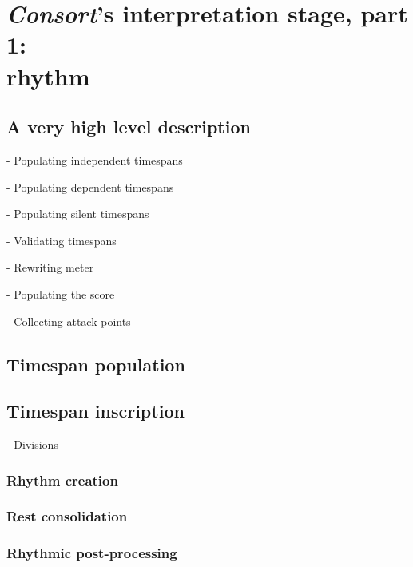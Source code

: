 \chapter[\emph{Consort}'s interpretation stage, part 1: rhythm]{
    \emph{Consort}'s interpretation stage, part 1:\\ rhythm}

\section{A very high level description}

- Populating independent timespans

- Populating dependent timespans

- Populating silent timespans

- Validating timespans

- Rewriting meter

- Populating the score

- Collecting attack points

\section{Timespan population}

\section{Timespan inscription}

- Divisions

\subsection{Rhythm creation}

\subsection{Rest consolidation}

\subsection{Rhythmic post-processing}

